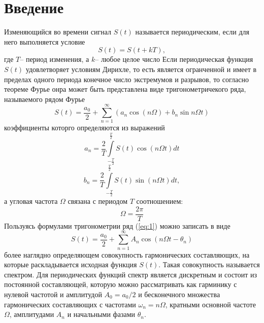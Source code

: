
\usepackage{setspace}



\def\labauthors{Понур К.А., Сарафанов Ф.Г., Сидоров Д.А.}
\def\labgroup{420}
\def\labnumber{3000}
\def\labtheme{Гармонический анализ и синтез периодических сигналов}
\renewcommand{\vec}{\mathbf}
\renewcommand{\Re}{\operatorname{Re}}
\renewcommand{\Im}{\operatorname{Im}}
\renewcommand{\phi}{\varphi}
\renewcommand{\kappa}{\varkappa}
\renewcommand{\hat}{\widehat}

\begin{spacing}{1}
\tableofcontents
\end{spacing}
\newpage
\section{Введение}
 	Изменяющийся во времени сигнал $S(t)$ называется периодическим, если для него выполняется условие
 	\begin{equation}
 		S(t)=S(t+kT),
 	\end{equation}
 	где $T$-- период изменения, а $k$-- любое целое число
Если периодическая функция $S(t)$ удовлетворяет условиям Дирихле, то есть является огранченной и имеет в пределах одного периода конечное число экстремумов и разрывов, то согласно теореме Фурье онра может быть представлена  виде тригонометричекого ряда, называемого рядом Фурье
\begin{equation}
	\label{eq:1}
	S(t)=\frac{a_0}{2}+\sum_{n=1}^\infty(a_n\cos(n\Omega )+b_n\sin{n\Omega t})
\end{equation}
коэффициенты которго определяются из выражений
\begin{equation}
	\label{eq:2.1}
	a_n=\frac{2}{T}\int\limits_{-\frac{T}{2}}^{\frac{T}{2}}S(t)\cos(n\Omega t )dt
\end{equation}
\begin{equation}
	\label{eq:2.2}
	b_n=\frac{2}{T}\int\limits_{-\frac{T}{2}}^{\frac{T}{2}}S(t)\sin(n\Omega t )dt,
\end{equation}
а угловая частота $\Omega$ связана с периодом $T$ соотношением:
\begin{equation}
	\Omega=\frac{2\pi}{T}
\end{equation}
Пользуясь формулами тригонометрии ряд (\ref{eq:1}) можно записать в виде
\begin{equation}
\label{eq:3}
 	S(t)=\frac{a_0}{2}+\sum_{n=1}^{\infty}A_n\cos(n\Omega t-\theta_n)
 \end{equation} 
 более наглядно определяющем совокупность гармонических составляющих, на которые раскладывается исходная функция $S(t)$. Такая совокупность называется спектром. Для периодических функций спектр является дискретным и состоит из постоянной составляющей, которую можно рассматривать как гарминику с нулевой частотой и амплитудой $A_0=a_0/2$ и бесконечного множества гармонических составляющих с частотами $\omega_n=n\Omega$, кратными основной частоте $\Omega$, амплитудами $A_n$ и начальными фазами $\theta_n$.

